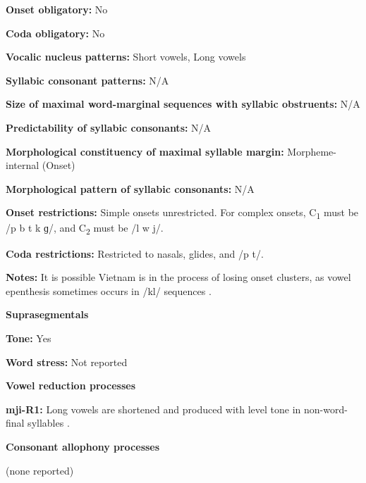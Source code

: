 \textbf{Onset obligatory:} No



\textbf{Coda obligatory:} No



\textbf{Vocalic nucleus patterns:} Short vowels, Long vowels



\textbf{Syllabic consonant patterns:} N/A



\textbf{Size of maximal word{}-marginal sequences with syllabic obstruents:} N/A



\textbf{Predictability of syllabic consonants:} N/A



\textbf{Morphological constituency of maximal syllable margin:} Morpheme-internal (Onset)



\textbf{Morphological pattern of syllabic consonants:} N/A



\textbf{Onset restrictions:} Simple onsets unrestricted. For complex onsets, C\textsubscript{1} must be /p b t k ɡ/, and C\textsubscript{2} must be /l w j/. 



\textbf{Coda restrictions:} Restricted to nasals, glides, and /p t/.



\textbf{Notes:} It is possible Vietnam  is in the process of losing onset clusters, as vowel epenthesis sometimes occurs in /kl/ sequences \citep[127]{Clark2008}.



\textbf{Suprasegmentals}



\textbf{Tone:} Yes



\textbf{Word stress:} Not reported



\textbf{Vowel reduction processes}



\textbf{mji-R1:} Long vowels are shortened and produced with level tone in non-word-final syllables \citep[117]{Clark2008}.



\textbf{Consonant allophony processes}



(none reported)



